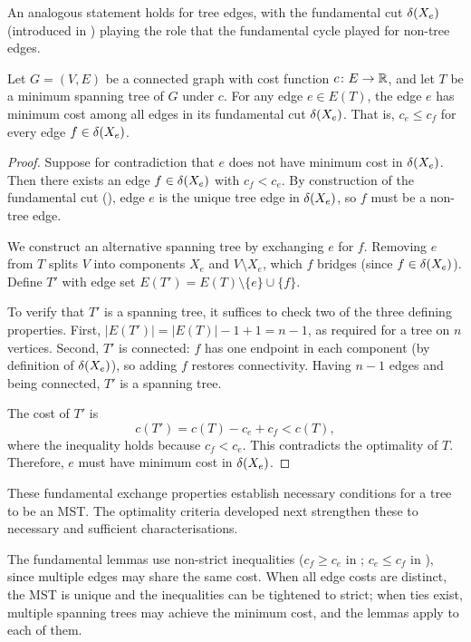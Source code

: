 An analogous statement holds for tree edges, with the fundamental cut $\delta(X_e)$ (introduced in ) playing the role that the fundamental cycle played for non-tree edges.

\begin{lemma}\label{lem:fund-cut}
Let $G = (V, E)$ be a connected graph with cost function $c \colon E \to \mathbb{R}$, and let $T$ be a minimum spanning tree of $G$ under $c$.
For any edge $e \in E(T)$, the edge $e$ has minimum cost among all edges in its fundamental cut $\delta(X_e)$.
That is, $c_e \leq c_f$ for every edge $f \in \delta(X_e)$.
\end{lemma}

\begin{proof}
Suppose for contradiction that $e$ does not have minimum cost in $\delta(X_e)$.
Then there exists an edge $f \in \delta(X_e)$ with $c_f < c_e$.
By construction of the fundamental cut (), edge $e$ is the unique tree edge in $\delta(X_e)$, so $f$ must be a non-tree edge.

We construct an alternative spanning tree by exchanging $e$ for $f$.
Removing $e$ from $T$ splits $V$ into components $X_e$ and $V \setminus X_e$, which $f$ bridges (since $f \in \delta(X_e)$).
Define $T'$ with edge set $E(T') = E(T) \setminus \{e\} \cup \{f\}$.

To verify that $T'$ is a spanning tree, it suffices to check two of the three defining properties.
First, $|E(T')| = |E(T)| - 1 + 1 = n - 1$, as required for a tree on $n$ vertices.
Second, $T'$ is connected: $f$ has one endpoint in each component (by definition of $\delta(X_e)$), so adding $f$ restores connectivity.
Having $n - 1$ edges and being connected, $T'$ is a spanning tree.

The cost of $T'$ is
\[
c(T') = c(T) - c_e + c_f < c(T),
\]
where the inequality holds because $c_f < c_e$.
This contradicts the optimality of $T$.
Therefore, $e$ must have minimum cost in $\delta(X_e)$.
\end{proof}

These fundamental exchange properties establish necessary conditions for a tree to be an MST.
The optimality criteria developed next strengthen these to necessary and sufficient characterisations.

\begin{remark}\label{rem:cost-ties}
The fundamental lemmas use non-strict inequalities ($c_f \geq c_e$ in ; $c_e \leq c_f$ in ), since multiple edges may share the same cost.
When all edge costs are distinct, the MST is unique and the inequalities can be tightened to strict; when ties exist, multiple spanning trees may achieve the minimum cost, and the lemmas apply to each of them.
\end{remark}

